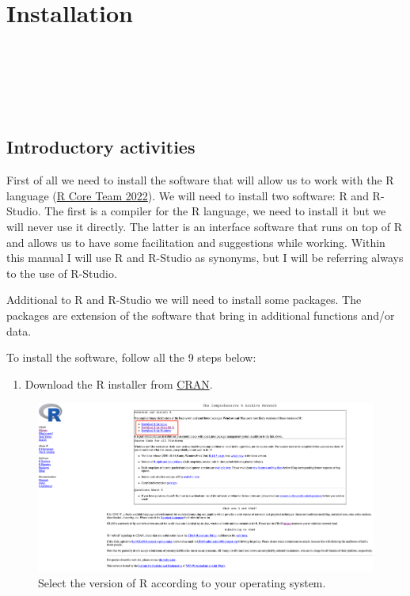 \documentclass[
]{article}
\providecommand{\tightlist}{%
  \setlength{\itemsep}{0pt}\setlength{\parskip}{0pt}}
\begin{document}
~

~

\hypertarget{installation}{%
\section{Installation}\label{installation}}

~

~

~

\hypertarget{introductory-activities}{%
\subsection{Introductory activities}\label{introductory-activities}}

First of all we need to install the software that will allow us to work
with the R language (\protect\hyperlink{ref-rcoreteam2022}{R Core Team 2022}). We will need to install two
software: R and R-Studio. The first is a compiler for the R language, we
need to install it but we will never use it directly. The latter is an
interface software that runs on top of R and allows us to have some
facilitation and suggestions while working. Within this manual I will
use R and R-Studio as synonyms, but I will be referring always to the
use of R-Studio.

Additional to R and R-Studio we will need to install some packages. The
packages are extension of the software that bring in additional
functions and/or data.

To install the software, follow all the 9 steps below:

\begin{enumerate}
\def\labelenumi{\arabic{enumi}.}
\tightlist
\item
  Download the R installer from \href{https://cran.r-project.org/}{CRAN}.\\
\end{enumerate}

\begin{figure}[H]

{\centering \includegraphics[width=0.8\linewidth,]{images/cran} 

}

\caption{Select the version of R according to your operating system.}\label{fig:unnamed-chunk-2}
\end{figure}
\end{document}
